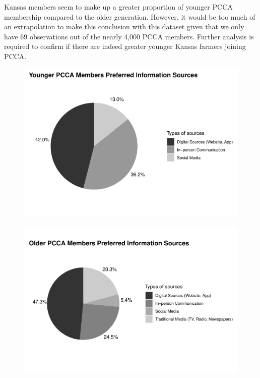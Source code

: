 \documentclass[a4paper]{article}
\begin{document}
Kansas members seem to make up a greater proportion of younger PCCA membership compared to the older generation. However, it would be too much of an extrapolation to make this conclusion with this dataset given that we only have 69 observations out of the nearly 4,000 PCCA members. Further analysis is required to confirm if there are indeed greater younger Kansas farmers joining PCCA.

\noindent\begin{minipage}{0.5\textwidth}
	\begin{figure}[H]
		\includegraphics[scale=0.5]{survey/pcca_survey_files/figure-latex/information-young-1.pdf}
	\end{figure}
\end{minipage}%
\begin{minipage}{0.5\textwidth}
	\begin{figure}[H]
		\includegraphics[scale=0.5]{survey/pcca_survey_files/figure-latex/information-old-1.pdf}
	\end{figure}
\end{minipage}
\end{document}

